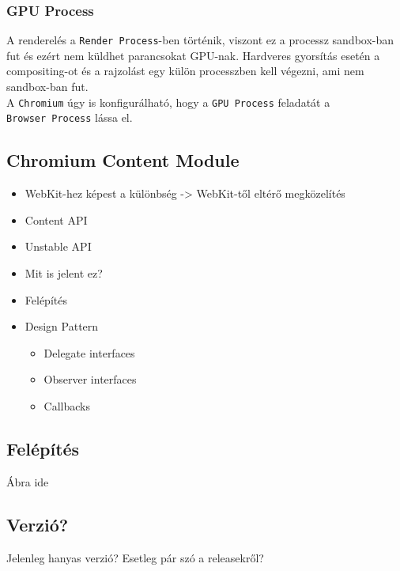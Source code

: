 \documentclass[12pt]{report}
\begin{document}
\subsubsection{GPU Process}
A renderelés a \texttt{Render Process}-ben történik, viszont ez a processz
sandbox-ban fut és ezért nem küldhet parancsokat GPU-nak. Hardveres gyorsítás esetén
a compositing-ot és a rajzolást egy külön processzben kell végezni, ami nem sandbox-ban fut.
\cite{bib-chromium-gpu} \\
A \texttt{Chromium} úgy is konfigurálható, hogy a \texttt{GPU Process} feladatát a \\
\texttt{Browser Process} lássa el.


\subsection{Chromium Content Module}
\begin{itemize}
    \item WebKit-hez képest a különbség -> WebKit-től eltérő megközelítés
    \item Content API
    \item Unstable API
    \item Mit is jelent ez?
    \item Felépítés
    \item Design Pattern
        \begin{itemize}
            \item Delegate interfaces
            \item Observer interfaces
            \item Callbacks
        \end{itemize}
\end{itemize}

\subsection{Felépítés}
Ábra ide

\subsection{Verzió?}
Jelenleg hanyas verzió? Esetleg pár szó a releasekről?
\end{document}
